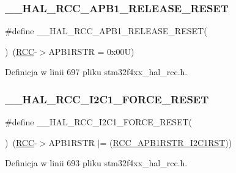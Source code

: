 \subsubsection{\texorpdfstring{\+\_\+\+\_\+\+H\+A\+L\+\_\+\+R\+C\+C\+\_\+\+A\+P\+B1\+\_\+\+R\+E\+L\+E\+A\+S\+E\+\_\+\+R\+E\+S\+ET}{\_\_HAL\_RCC\_APB1\_RELEASE\_RESET}}
{\footnotesize\ttfamily \#define \+\_\+\+\_\+\+H\+A\+L\+\_\+\+R\+C\+C\+\_\+\+A\+P\+B1\+\_\+\+R\+E\+L\+E\+A\+S\+E\+\_\+\+R\+E\+S\+ET(\begin{DoxyParamCaption}{ }\end{DoxyParamCaption})~(\hyperlink{group___peripheral__declaration_ga74944438a086975793d26ae48d5882d4}{R\+CC}-\/$>$A\+P\+B1\+R\+S\+TR = 0x00\+U)}



Definicja w linii 697 pliku stm32f4xx\+\_\+hal\+\_\+rcc.\+h.

\mbox{\label{group___r_c_c___a_p_b1___force___release___reset_ga551c171f88af86ca985db634ac9e3275}} 
\subsubsection{\texorpdfstring{\+\_\+\+\_\+\+H\+A\+L\+\_\+\+R\+C\+C\+\_\+\+I2\+C1\+\_\+\+F\+O\+R\+C\+E\+\_\+\+R\+E\+S\+ET}{\_\_HAL\_RCC\_I2C1\_FORCE\_RESET}}
{\footnotesize\ttfamily \#define \+\_\+\+\_\+\+H\+A\+L\+\_\+\+R\+C\+C\+\_\+\+I2\+C1\+\_\+\+F\+O\+R\+C\+E\+\_\+\+R\+E\+S\+ET(\begin{DoxyParamCaption}{ }\end{DoxyParamCaption})~(\hyperlink{group___peripheral__declaration_ga74944438a086975793d26ae48d5882d4}{R\+CC}-\/$>$A\+P\+B1\+R\+S\+TR $\vert$= (\hyperlink{group___peripheral___registers___bits___definition_gadcd25346a7d7b0009090adfbca899b93}{R\+C\+C\+\_\+\+A\+P\+B1\+R\+S\+T\+R\+\_\+\+I2\+C1\+R\+ST}))}



Definicja w linii 693 pliku stm32f4xx\+\_\+hal\+\_\+rcc.\+h.

